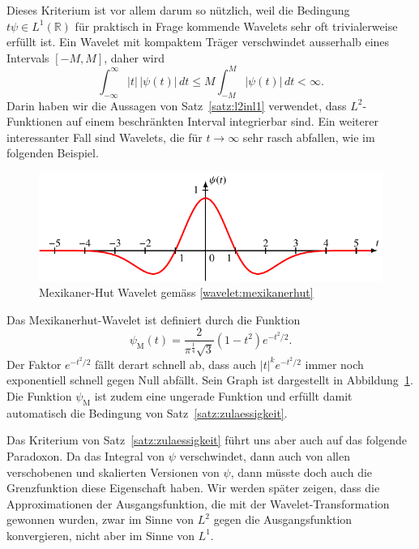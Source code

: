 
Dieses Kriterium ist vor allem darum so nützlich, weil die Bedingung
$t\psi\in L^1(\mathbb R)$ für praktisch in Frage kommende Wavelets sehr
oft trivialerweise erfüllt ist.
Ein Wavelet mit kompaktem Träger verschwindet ausserhalb eines Intervals
$[-M,M]$, daher wird 
\[
\int_{-\infty}^\infty |t|\,|\psi(t)|\,dt
\le 
M \int_{-M}^M |\psi(t)|\,dt < \infty.
\]
Darin haben wir die Aussagen von Satz~\ref{satz:l2inl1} verwendet,
dass $L^2$-Funktionen auf einem beschränkten Interval integrierbar sind.
Ein weiterer interessanter Fall sind Wavelets, die für $t\to\infty$
sehr rasch abfallen, wie im folgenden Beispiel.

\begin{beispiel}
\begin{figure}
\centering
\includegraphics{chapters/4-cwt/images/mexican.pdf}
\caption{Mexikaner-Hut Wavelet gemäss
\eqref{wavelet:mexikanerhut}
\label{wavelet:mexikanerhut:graph}}
\end{figure}
Das Mexikanerhut-Wavelet ist definiert durch die Funktion
\begin{equation}
\psi_{\text{M}}(t) = \frac{2}{\pi^{\frac14}\sqrt{3}}(1-t^2) e^{-t^2/2}.
\label{wavelet:mexikanerhut}
\end{equation}
Der Faktor $e^{-t^2/2}$ fällt derart schnell ab, dass auch $|t|^k e^{-t^2/2}$
immer noch exponentiell schnell gegen Null abfällt.
Sein Graph ist dargestellt in Abbildung~\ref{wavelet:mexikanerhut:graph}.
Die Funktion $\psi_{\text{M}}$ ist zudem eine ungerade Funktion und %
erfüllt damit automatisch die Bedingung von Satz~\ref{satz:zulaessigkeit}.
\end{beispiel}

Das Kriterium von Satz~\ref{satz:zulaessigkeit} führt uns aber auch auf
das folgende Paradoxon. 
Da das Integral von $\psi$ verschwindet, dann auch von allen verschobenen
und skalierten Versionen von $\psi$, dann müsste doch auch die Grenzfunktion
diese Eigenschaft haben.
Wir werden später zeigen, dass die Approximationen der Ausgangsfunktion,
die mit der Wavelet-Transformation gewonnen wurden, zwar im Sinne von $L^2$
gegen die Ausgangsfunktion konvergieren, nicht aber im Sinne von $L^1$.



